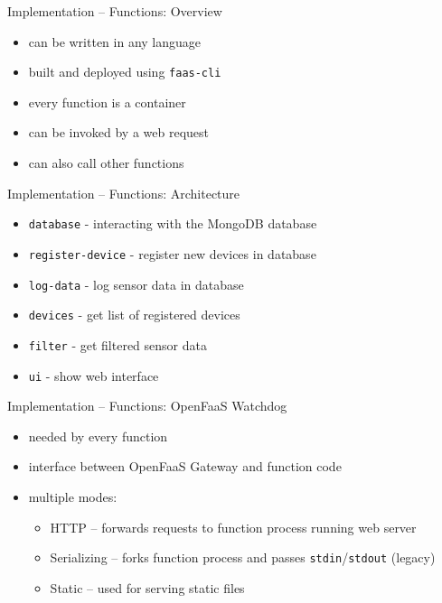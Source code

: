 \begin{frame}{Implementation -- Functions: Overview}
  \begin{itemize}
    \item can be written in any language
    \item built and deployed using \texttt{faas-cli}
    \item every function is a container
    \item can be invoked by a web request
    \item can also call other functions
  \end{itemize}
\end{frame}

\begin{frame}{Implementation -- Functions: Architecture}
  \begin{itemize}
    \item \texttt{database} - interacting with the MongoDB database
    \item \texttt{register-device} - register new devices in database
    \item \texttt{log-data} - log sensor data in database
    \item \texttt{devices} - get list of registered devices
    \item \texttt{filter} - get filtered sensor data
    \item \texttt{ui} - show web interface
  \end{itemize}
\end{frame}

\begin{frame}{Implementation -- Functions: OpenFaaS Watchdog}
  \begin{itemize}
    \item needed by every function
    \item interface between OpenFaaS Gateway and function code
    \item multiple modes:
      \begin{itemize}
        \item HTTP -- forwards requests to function process running web server
        \item Serializing -- forks function process and passes \texttt{stdin}/\texttt{stdout} (legacy)
        \item Static -- used for serving static files
      \end{itemize}
  \end{itemize}
\end{frame}

